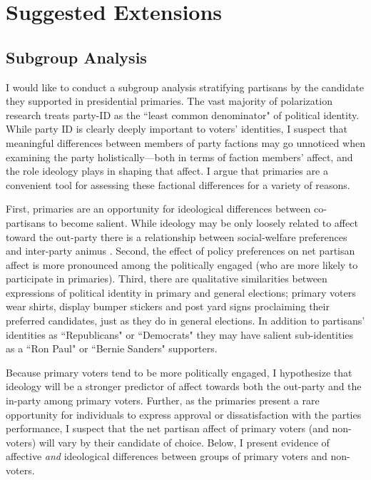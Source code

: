 \documentclass[12pt]{article}
\begin{document}
\section{Suggested Extensions}
\subsection{Subgroup Analysis}
I would like to conduct a subgroup analysis stratifying partisans by the candidate they supported in presidential primaries. The vast majority of polarization research treats party-ID as the ``least common denominator" of political identity. While party ID is clearly deeply important to voters' identities, I suspect that meaningful differences between members of party factions may go unnoticed when examining the party holistically---both in terms of faction members' affect, and the role ideology plays in shaping that affect. I argue that primaries are a convenient tool for assessing these factional differences for a variety of reasons.

 First, primaries are an opportunity for ideological differences between co-partisans to become salient. While ideology may be only loosely related to affect toward the out-party there is a relationship between social-welfare preferences and inter-party animus \citep[p. 423]{iyengar2012affect}. Second, the effect of policy preferences on net partisan affect is more pronounced among the politically engaged (who are more likely to participate in primaries). Third, there are qualitative similarities between expressions of political identity in primary and general elections; primary voters wear shirts, display bumper stickers and post yard signs proclaiming their preferred candidates, just as they do in general elections. In addition to partisans' identities as  ``Republicans" or ``Democrats" they may have salient sub-identities as a ``Ron Paul" or ``Bernie Sanders" supporters.
 
Because primary voters tend to be more politically engaged, I hypothesize that ideology will be a stronger predictor of affect towards both the out-party and the in-party among primary voters. Further, as the primaries present a rare opportunity for individuals to express approval or dissatisfaction with the parties performance, I suspect that the net partisan affect of primary voters (and non-voters) will vary by their candidate of choice. Below, I present evidence of affective \textit{and} ideological differences between groups of primary voters and non-voters.
\end{document}
